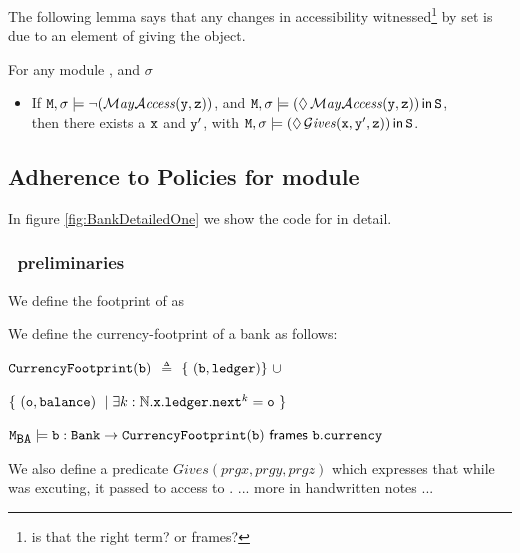 \documentclass[acmsmall,screen]{acmart}
\begin{document}
The following lemma says that any changes in accessibility witnessed\footnote{is that the right term? or frames?}
by set  is due to an element of  giving the object.

\begin{lemma}
For any module \M, and  $\sigma$

\begin{itemize}
\item
If  ${\mbox{\tt{M}}}, \sigma  \models \neg(\mathcal{M}\textrm{\textit{ay}}{\mathcal{A}}\textrm{\textit{ccess}}({\mbox{\tt{y}}},{\mbox{\tt{z}}}))$, and
${\mbox{\tt{M}}}, \sigma \models (\lozenge\, \mathcal{M}\textrm{\textit{ay}}{\mathcal{A}}\textrm{\textit{ccess}}({\mbox{\tt{y}}},{\mbox{\tt{z}}}))\,{\bf{\sf {in}}}\, {\mbox{\tt{S}}}$, \\
 then there exists a  ${\mbox{\tt{x}}}$  and  ${\mbox{\tt{y}}}'$, with
${\mbox{\tt{M}}},\sigma \models (\lozenge\, \mathcal{G}\textrm{\textit{ives}}({\mbox{\tt{x}}},{\mbox{\tt{y}}}',{\mbox{\tt{z}}}))\,{\bf{\sf {in}}}\, {\mbox{\tt{S}}}$.
\end{itemize}

\end{lemma}

\subsection{Adherence to Policies for module \MOne}
\label{section:Adherence:ModuleOne}

In figure \ref{fig:BankDetailedOne} we show the  code for \MOne in detail.

\subsubsection{\MOne~preliminaries}
We define the footprint of  as

\begin{definition}We define the currency-footprint of a bank as follows:

${\mbox{\tt{CurrencyFootprint}}}({\mbox{\tt{b}}})$ $\triangleq$
$\{ \ (\prg{b},\prg{ledger}) \} \ \cup$\\
\strut \hspace{4.8cm}
$\{ \ ({\mbox{\tt{o}}},{\mbox{\tt{balance}}})\ \mid \exists k:\mathbb{N}. {\mbox{\tt{x}}}.{\mbox{\tt{ledger}}}.{\mbox{\tt{next}}}^k={\mbox{\tt{o}}} \ \}$
\end{definition}

\begin{lemma}
${{\mbox{\tt{M}}}_{{\mbox{\tt{BA}}}}} \models {\mbox{\tt{b}}}:{\mbox{\tt{Bank}}} \rightarrow {\mbox{\tt{CurrencyFootprint}}}({\mbox{\tt{b}}}) ~{\bf{\sf {frames}}}~ {\mbox{\tt{b}}}.{\mbox{\tt{currency}}}$
\end{lemma}

We also define a predicate $Gives(prg{x},prg{y},prg{z})$ which expresses that while  was excuting, it
passed to  access to .
... more in handwritten notes ...
\end{document}
